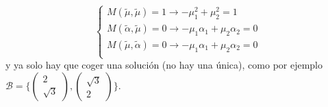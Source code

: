 \begin{problem}[7]
$$\begin{cases}
	M(\tilde{\mu},\tilde{\mu})=1\longrightarrow-\mu_1^2+\mu_2^2=1\\
	M(\tilde{\alpha},\tilde{\mu})=0\longrightarrow-\mu_1\alpha_1+\mu_2\alpha_2=0\\
	M(\tilde{\mu},\tilde{\alpha})=0\longrightarrow-\mu_1\alpha_1+\mu_2\alpha_2=0\\
	\end{cases}$$
	y ya solo hay que coger una solución (no hay una única), como por ejemplo $\mathcal{B}=\{\begin{pmatrix}2\\\sqrt{3}\end{pmatrix},\begin{pmatrix}\sqrt{3}\\2\end{pmatrix}\}$.
\end{problem}
